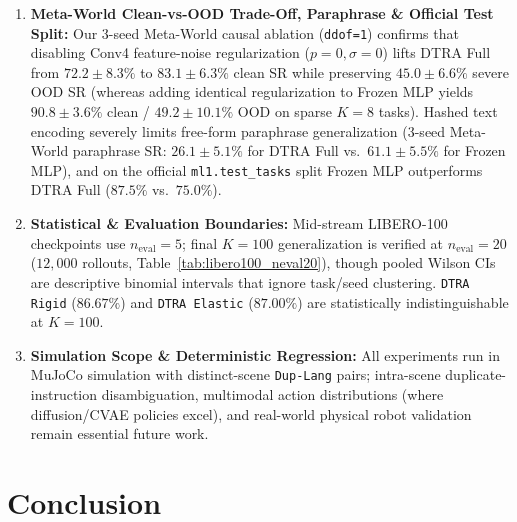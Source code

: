 \documentclass[10pt]{article}
\begin{document}
\begin{enumerate}[leftmargin=*,itemsep=1.5pt,topsep=2pt]
  \item \textbf{Meta-World Clean-vs-OOD Trade-Off, Paraphrase \& Official Test Split:} Our 3-seed Meta-World causal ablation (\texttt{ddof=1}) confirms that disabling Conv4 feature-noise regularization ($p=0,\sigma=0$) lifts DTRA Full from $72.2 \pm 8.3\%$ to $83.1 \pm 6.3\%$ clean SR while preserving $45.0 \pm 6.6\%$ severe OOD SR (whereas adding identical regularization to Frozen MLP yields $90.8 \pm 3.6\%$ clean / $49.2 \pm 10.1\%$ OOD on sparse $K=8$ tasks). Hashed text encoding severely limits free-form paraphrase generalization (3-seed Meta-World paraphrase SR: $26.1 \pm 5.1\%$ for DTRA Full vs.\ $61.1 \pm 5.5\%$ for Frozen MLP), and on the official \texttt{ml1.test\_tasks} split Frozen MLP outperforms DTRA Full ($87.5\%$ vs.\ $75.0\%$).
  \item \textbf{Statistical \& Evaluation Boundaries:} Mid-stream LIBERO-100 checkpoints use $n_{\text{eval}}=5$; final $K=100$ generalization is verified at $n_{\text{eval}}=20$ ($12{,}000$ rollouts, Table~\ref{tab:libero100_neval20}), though pooled Wilson CIs are descriptive binomial intervals that ignore task/seed clustering. \texttt{DTRA Rigid} ($86.67\%$) and \texttt{DTRA Elastic} ($87.00\%$) are statistically indistinguishable at $K=100$.
  \item \textbf{Simulation Scope \& Deterministic Regression:} All experiments run in MuJoCo simulation with distinct-scene \texttt{Dup-Lang} pairs; intra-scene duplicate-instruction disambiguation, multimodal action distributions (where diffusion/CVAE policies excel), and real-world physical robot validation remain essential future work.
\end{enumerate}

\section{Conclusion}
\label{sec:conclusion}
\end{document}
